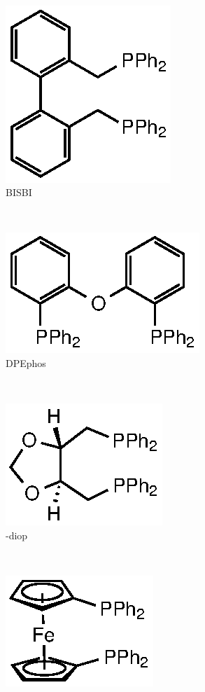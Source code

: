 \begin{figure}[htbp]
~
\begin{subfigure}[b]{0.3\textwidth}
	\centering
	\includegraphics{../Figures/Diphosphines/BISBI.eps}
	\caption{BISBI}
	\label{BISBI}
\end{subfigure}
~
\begin{subfigure}[b]{0.3\textwidth}
	\centering
	\includegraphics{../Figures/Xantphosderivatives/DPEphos.eps}
	\caption{DPEphos}
	\label{DPEphosB}
\end{subfigure}
\\
\vspace{0.5cm}
\begin{subfigure}[b]{0.3\textwidth}
	\centering
	\includegraphics{../Figures/Diphosphines/DIOP.eps}
	\caption{-diop}
	\label{diop}
\end{subfigure}
~
\begin{subfigure}[b]{0.3\textwidth}
	\centering
	\includegraphics{../Figures/Diphosphines/dppf.eps}

\end{subfigure}
\end{figure}
